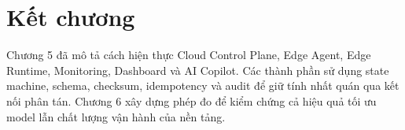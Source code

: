 \section{Kết chương}

Chương 5 đã mô tả cách hiện thực Cloud Control Plane, Edge Agent, Edge Runtime,
Monitoring, Dashboard và AI Copilot. Các thành phần sử dụng state machine,
schema, checksum, idempotency và audit để giữ tính nhất quán qua kết nối phân
tán. Chương 6 xây dựng phép đo để kiểm chứng cả hiệu quả tối ưu model lẫn chất
lượng vận hành của nền tảng.